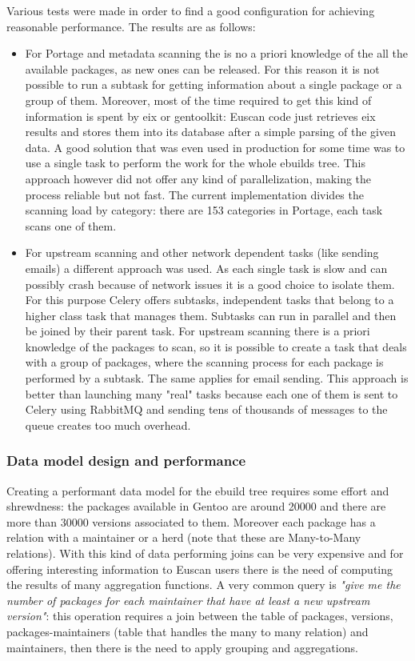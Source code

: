 Various tests were made in order to find a good configuration for achieving reasonable performance. The results are as follows:
\begin{itemize}
\item For Portage and metadata scanning the is no a priori knowledge of the all the available packages, as new ones can be released. For this reason it is not possible to run a subtask for getting information about a single package or a group of them. Moreover, most of the time required to get this kind of information is spent by eix or gentoolkit: Euscan code just retrieves eix results and stores them into its database after a simple parsing of the given data. A good solution that was even used in production for some time was to use a single task to perform the work for the whole ebuilds tree. This approach however did not offer any kind of parallelization, making the process reliable but not fast. The current implementation divides the scanning load by category: there are 153 categories in Portage, each task scans one of them.

\item For upstream scanning and other network dependent tasks (like sending emails) a different approach was used. As each single task is slow and can possibly crash because of network issues it is a good choice to isolate them. For this purpose Celery offers subtasks, independent tasks that belong to a higher class task that manages them. Subtasks can run in parallel and then be joined by their parent task.
For upstream scanning there is a priori knowledge of the packages to scan, so it is possible to create a task that deals with a group of packages, where the scanning process for each package is performed by a subtask. The same applies for email sending.
This approach is better than launching many "real" tasks because each one of them is sent to Celery using RabbitMQ and sending tens of thousands of messages to the queue creates too much overhead.
\end{itemize}

\subsubsection{Data model design and performance}
Creating a performant data model for the ebuild tree requires some effort and shrewdness: the packages available in Gentoo are around 20000 and there are more than 30000 versions associated to them. Moreover each package has a relation with a maintainer or a herd (note that these are Many-to-Many relations). With this kind of data performing joins can be very expensive and for offering interesting information to Euscan users there is the need of computing the results of many aggregation functions. A very common query is \emph{"give me the number of packages for each maintainer that have at least a new upstream version"}: this operation requires a join between the table of packages, versions, packages-maintainers (table that handles the many to many relation) and maintainers, then there is the need to apply grouping and aggregations.

